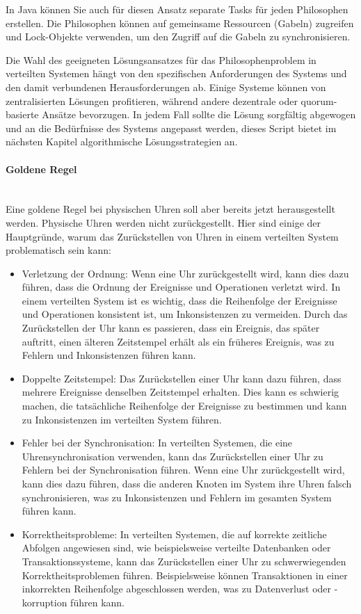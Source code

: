 \documentclass[../vs-script-first-v01.tex]{subfiles}
\begin{document}
In Java können Sie auch für diesen Ansatz separate Tasks für jeden Philosophen erstellen. Die Philosophen können auf gemeinsame Ressourcen (Gabeln) zugreifen und Lock-Objekte verwenden, um den Zugriff auf die Gabeln zu synchronisieren.

Die Wahl des geeigneten Lösungsansatzes für das Philosophenproblem in verteilten Systemen hängt von den spezifischen Anforderungen des Systems und den damit verbundenen Herausforderungen ab. Einige Systeme können von zentralisierten Lösungen profitieren, während andere dezentrale oder quorum-basierte Ansätze bevorzugen. In jedem Fall sollte die Lösung sorgfältig abgewogen und an die Bedürfnisse des Systems angepasst werden, dieses Script bietet im nächsten Kapitel algorithmische Lösungsstrategien an.

\paragraph{Goldene Regel\\\\}
Eine goldene Regel bei physischen Uhren soll aber bereits jetzt herausgestellt werden. Physische Uhren werden nicht zurückgestellt. Hier sind einige der Hauptgründe, warum das Zurückstellen von Uhren in einem verteilten System problematisch sein kann:
\begin{itemize}
\item Verletzung der Ordnung: Wenn eine Uhr zurückgestellt wird, kann dies dazu führen, dass die Ordnung der Ereignisse und Operationen verletzt wird. In einem verteilten System ist es wichtig, dass die Reihenfolge der Ereignisse und Operationen konsistent ist, um Inkonsistenzen zu vermeiden. Durch das Zurückstellen der Uhr kann es passieren, dass ein Ereignis, das später auftritt, einen älteren Zeitstempel erhält als ein früheres Ereignis, was zu Fehlern und Inkonsistenzen führen kann.
\item Doppelte Zeitstempel: Das Zurückstellen einer Uhr kann dazu führen, dass mehrere Ereignisse denselben Zeitstempel erhalten. Dies kann es schwierig machen, die tatsächliche Reihenfolge der Ereignisse zu bestimmen und kann zu Inkonsistenzen im verteilten System führen.
\item Fehler bei der Synchronisation: In verteilten Systemen, die eine Uhrensynchronisation verwenden, kann das Zurückstellen einer Uhr zu Fehlern bei der Synchronisation führen. Wenn eine Uhr zurückgestellt wird, kann dies dazu führen, dass die anderen Knoten im System ihre Uhren falsch synchronisieren, was zu Inkonsistenzen und Fehlern im gesamten System führen kann.
\item Korrektheitsprobleme: In verteilten Systemen, die auf korrekte zeitliche Abfolgen angewiesen sind, wie beispielsweise verteilte Datenbanken oder Transaktionssysteme, kann das Zurückstellen einer Uhr zu schwerwiegenden Korrektheitsproblemen führen. Beispielsweise können Transaktionen in einer inkorrekten Reihenfolge abgeschlossen werden, was zu Datenverlust oder -korruption führen kann.
\end{itemize}
\end{document}

